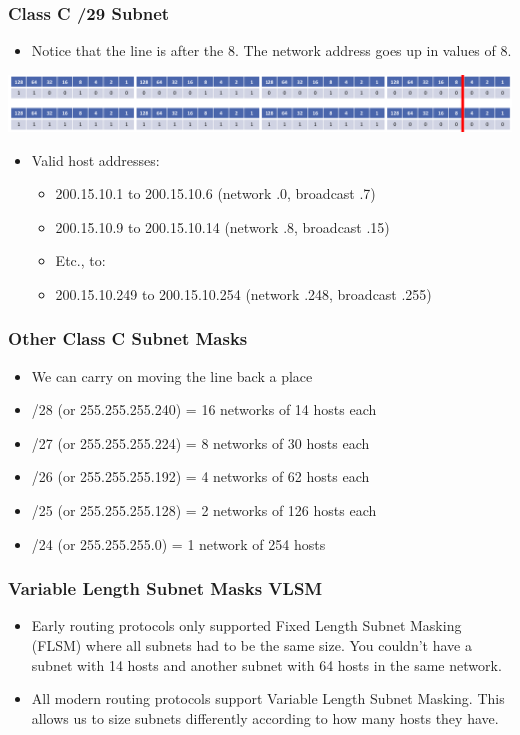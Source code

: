 \documentclass[pdflatex,compress]{beamer}
\begin{document}
\begin{frame}
	\frametitle{Class C /29 Subnet}
	\begin{itemize}
		\item Notice that the line is after the 8. The network address goes up in values of 8.
	\end{itemize}
	\begin{center}
		\includegraphics[width=1\linewidth]{img/img05}
	\end{center}
	\begin{itemize}
		\item Valid host addresses:
		\begin{itemize}
			\item 200.15.10.1 to 200.15.10.6 (network .0, broadcast .7)
			\item 200.15.10.9 to 200.15.10.14 (network .8, broadcast .15)
			\item Etc., to:
			\item 200.15.10.249 to 200.15.10.254 (network .248, broadcast .255)
		\end{itemize}
	\end{itemize}
\end{frame}

\begin{frame}
	\frametitle{Other Class C Subnet Masks}
	\begin{itemize}
		\item We can carry on moving the line back a place
		\item /28 (or 255.255.255.240) = 16 networks of 14 hosts each
		\item /27 (or 255.255.255.224) = 8 networks of 30 hosts each
		\item /26 (or 255.255.255.192) = 4 networks of 62 hosts each
		\item /25 (or 255.255.255.128) = 2 networks of 126 hosts each
		\item /24 (or 255.255.255.0) = 1 network of 254 hosts
	\end{itemize}
\end{frame}

\begin{frame}
	\frametitle{Variable Length Subnet Masks VLSM}
	\begin{itemize}
		\item Early routing protocols only supported Fixed Length Subnet Masking (FLSM) where all subnets had to be the same size. You couldn’t have a subnet with 14 hosts and another subnet with 64 hosts in the same network.
		\item All modern routing protocols support Variable Length Subnet Masking. This allows us to size subnets differently according to how many hosts they have.
	\end{itemize}
\end{frame}
\end{document}
